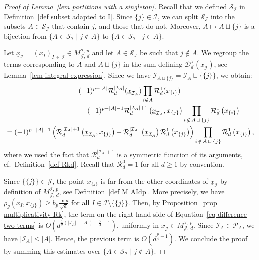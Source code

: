 \documentclass[AHL,Unicode,longabstracts,published]{cedram}
\newcommand{\D}{\mathcal{D}}
\newcommand{\I}{\mathcal{I}}
\newcommand{\J}{\mathcal{J}}
\newcommand{\clR}{\mathcal{R}}
\newcommand{\clS}{\mathcal{S}}
\newcommand{\pa}{\mathcal{P}\!}
\newcommand{\norm}[1]{\left\lvert #1 \right\rvert}
\renewcommand{\geq}{\geqslant}
\renewcommand{\leq}{\leqslant}
\begin{document}
\begin{proof}[Proof of Lemma~\ref{lem partitions with a singleton}]
Recall that we defined $\clS_\I$ in Definition~\ref{def subset adapted to I}. Since $\{j\} \in \I$, we can split $\clS_\I$ into the subsets $A \in \clS_\I$ that contain $j$, and those that do not. Moreover, $A \mapsto A \sqcup \{j\}$ is a bijection from $\{ A \in \clS_\I \mid j \notin A\}$ to $\{ A \in \clS_\I \mid j \in A\}$.

Let $\underline{x}_\I =(x_I)_{I\,\in\,\I} \in M^{\I,\,p}_{\J,\,d}$ and let $A \in \clS_\I$ be such that $j \notin A$. We regroup the terms corresponding to $A$ and $A \sqcup\{j\}$ in the sum defining $\D_d^\I(\underline{x}_\I)$, see Lemma~\ref{lem integral expression}. Since we have $\I_{A \sqcup \{j\}} = \I_A \sqcup \{\{j\}\}$, we obtain:
\begin{multline}\label{eq difference two terms}
(-1)^{p - \norm{A}} \clR_d^{\norm{\I_A}}(\underline{x}_{\I_A}) \prod_{i \notin A} \clR_d^1(x_{\{i\}})\\
\begin{aligned}
& \mkern190mu+ (-1)^{p - \norm{A}-1} \clR_d^{\norm{\I_A}+1}\left(\underline{x}_{\I_A},x_{\{j\}}\right) \prod_{i\,\notin\,A \,\sqcup\,\{j\}} \clR_d^1\left(x_{\{i\}}\right)\\
&= (-1)^{p - \norm{A}-1} \left(\clR_d^{\norm{\I_A}+1}\left(\underline{x}_{\I_A},x_{\{j\}}\right)-\clR_d^{\norm{\I_A}}\left(\underline{x}_{\I_A}\right)\clR_d^1\left(x_{\{j\}}\right)\right)\prod_{i\,\notin\,A\,\sqcup\,\{j\}} \clR_d^1\left(x_{\{i\}}\right),
\end{aligned}
\end{multline}
where we used the fact that $\clR_d^{|\I_A|+1}$ is a symmetric function of its arguments, cf.~Definition~\ref{def Rkd}. Recall that $\clR^0_d=1$ for all $d \geq 1$ by convention.

Since $\{\{j\}\} \in \J$, the point $x_{\{j\}}$ is far from the other coordinates of $\underline{x}_\I$ by definition of $M^{\I,\,p}_{\J,\,d}$, see Definition~\ref{def M AIdp}. More precisely, we have $\rho_g(x_I,x_{\{j\}}) \geq b_p \tfrac{\ln d}{\sqrt{d}}$ for all $I \in \I \setminus \{\{j\}\}$. Then, by Proposition~\ref{prop multiplicativity Rk}, the term on the right-hand side of Equation~\eqref{eq difference two terms} is $O(d^{\frac{1}{2}(|\I_A|-|A|)+ \frac{p}{4}-1})$, uniformly in $\underline{x}_\I \in M^{\I,\,p}_{\J,\,d}$. Since $\I_A \in \pa_A$, we have $|\I_A| \leq |A|$. Hence, the previous term is $O(d^{\frac{p}{4}-1})$. We conclude the proof by summing this estimates over $\{ A \in \clS_\I \mid j \notin A\}$.
\end{proof}
\end{document}
